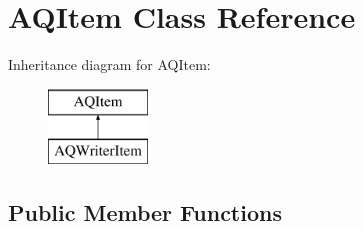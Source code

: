 \hypertarget{class_a_q_item}{}\section{A\+Q\+Item Class Reference}
\label{class_a_q_item}
Inheritance diagram for A\+Q\+Item\+:\begin{figure}[H]
\begin{center}
\leavevmode
\includegraphics[height=2.000000cm]{class_a_q_item}
\end{center}
\end{figure}
\subsection*{Public Member Functions}
